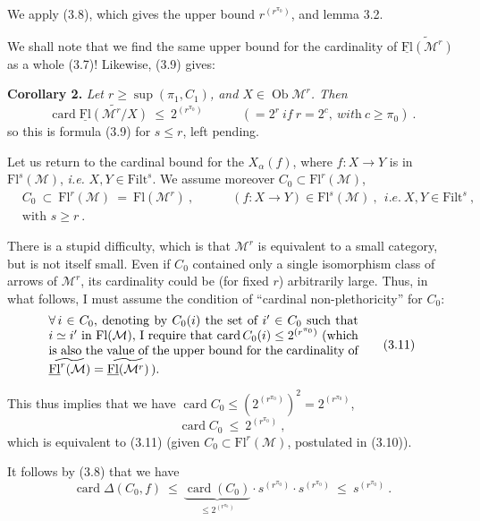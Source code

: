 \documentclass[11pt]{article}
\newcommand{\printedpage}[1]{\marginpar{\footnotesize p.~#1}}
\newcommand{\msp}[1]{\marginpar{\footnotesize [#1]}}
\newcommand{\M}{\mathcal{M}}
\newcommand{\Filt}{\mathrm{Filt}}
\newcommand{\Fl}{\mathrm{Fl}}
\newcommand{\uFl}{\underline{\mathrm{Fl}}}
\newcommand{\card}{\operatorname{card}}
\newcommand{\Ob}{\operatorname{Ob}}
\newcommand{\wavy}[1]{\widetilde{#1}}
\begin{document}
We apply (3.8), which gives the upper bound $r^{(r^{\pi_0})}$, and lemma 3.2.

We shall note that we find the same upper bound for the cardinality of $\wavy{\uFl(\M^r)}$ as a whole (3.7)! Likewise, (3.9) gives:

\textbf{Corollary 2.} \textit{Let $r\geq\sup(\pi_1,C_1)$, and $X\in\Ob\M^r$. Then}
\[
\card\wavy{\uFl(\M^r/X)}\ \leq\ 2^{(r^{\pi_0})}\qquad\quad(=2^r\ \textit{if}\ r=2^c,\ \textit{with}\ c\geq\pi_0)\ . \tag*{(3.11)}
\]
so this is formula (3.9) for $s\leq r$, left pending.

\msp{page 24}
Let us return to the cardinal bound for the $X_\alpha(f)$, where $f : X\longrightarrow Y$ is in $\Fl^s(\M)$, \textit{i.e.} $X,Y\in\Filt^s$. We assume moreover $C_0\subset\Fl^r(\M)$,
\[
\begin{aligned}
&C_0\ \subset\ \Fl^r(\M)\ =\ \Fl(\M^r)\ ,\qquad\quad(f:X\longrightarrow Y)\in\Fl^s(\M)\ ,\ \ \textit{i.e.}\ X,Y\in\Filt^s\ ,\\
&\text{with } s\geq r\ .
\end{aligned} \tag*{(3.10)}
\]

 There is a stupid difficulty, which is that $\M^r$ is equivalent to a small category, but is not itself small. Even if $C_0$ contained only a single isomorphism class of arrows of $\M^r$, its cardinality could be (for fixed $r$) arbitrarily large. Thus, in what follows, I must assume the condition of ``cardinal non-plethoricity'' for $C_0$:
\[
\parbox{0.72\linewidth}{$\forall\,i\in C_0$, denoting by $C_0(i)$ the set of $i'\in C_0$ such that $i\simeq i'$ in $\Fl(\M)$, I require that $\card C_0(i)\leq 2^{(r^{\pi_0})}$ (which is also the value of the upper bound for the cardinality of $\wavy{\uFl^r(\M)}=\wavy{\uFl(\M^r)}$\,).} \tag*{(3.11)}
\]

\printedpage{17}
 This thus implies that we have $\card C_0\leq(2^{(r^{\pi_0})})^2=2^{(r^{\pi_0})}$,
\[
\card C_0\ \leq\ 2^{(r^{\pi_0})}\ , \tag*{(3.12)}
\]
which is equivalent to (3.11) (given $C_0\subset\Fl^r(\M)$, postulated in (3.10)).

It follows by (3.8) that we have
\[
\card\Delta(C_0,f)\ \leq\ \underbrace{\card(C_0)}_{\leq 2^{(r^{\pi_0})}}\cdot s^{(r^{\pi_0})}\cdot s^{(r^{\pi_0})}\ \leq\ s^{(r^{\pi_0})}\ .
\]
\end{document}
